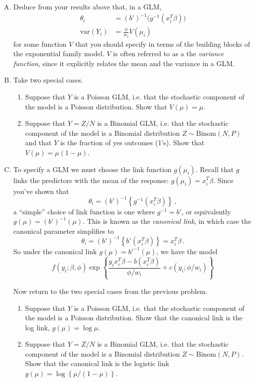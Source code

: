 \documentclass{mynotes}
\begin{document}
\begin{enumerate}[(A)]

\item Deduce from your results above that, in a GLM,
 $$
\begin{aligned}
\theta_i &= (b')^{-1} \Big( g^{-1}(x_i^T \beta) \Big) \\
\mbox{var} (Y_i ) &= \frac{\phi}{w_i} V(\mu_i)
\end{aligned}
$$
for some function $V$ that you should specify in terms of the building blocks of the exponential family model.  $V$ is often referred to as a the \emph{variance function}, since it explicitly relates the mean and the variance in a GLM.  

\item Take two special cases.  
\begin{enumerate}[(1)]
\item Suppose that $Y$ is a Poisson GLM, i.e. that the stochastic component of the model is a Poisson distribution.  Show that $V(\mu) = \mu$.
\item Suppose that $Y = Z/N$ is a Binomial GLM, i.e. that the stochastic component of the model is a Binomial distribution $Z \sim \mbox{Binom}(N, P)$ and that $Y$ is the fraction of yes outcomes (1's).  Show that $V(\mu) = \mu(1-\mu)$.  
\end{enumerate}

\item To specify a GLM we must choose the link function $g(\mu_i)$.  Recall that $g$ links the predictors with the mean of the response: $g(\mu_i) = x_i^T \beta$.  Since you've shown that
$$
\theta_i = (b')^{-1} \left\{g^{-1}(x_i^T \beta) \right\} \, ,
$$
a ``simple'' choice of link function is one where $g^{-1} = b'$, or equivalently $g(\mu) = (b')^{-1}(\mu)$.  This is known as the \textit{canonical link}, in which case the canonical parameter simplifies to
$$
\theta_i = (b')^{-1} \left\{b'(x_i^T \beta) \right\} = x_i^T \beta \, .
$$
So under the canonical link $g(\mu) = b'^{-1}(\mu)$, we have the model
$$
f(y_i; \beta, \phi) \exp \left\{ \frac{y_i x_i^T \beta - b(x_i^T \beta)}{\phi/w_i} + c(y_i; \phi/w_i)   \right \}
$$

Now return to the two special cases from the previous problem.
\begin{enumerate}[(1)]
\item Suppose that $Y$ is a Poisson GLM, i.e. that the stochastic component of the model is a Poisson distribution. Show that the canonical link is the log link, $g(\mu) = \log \mu$.  
\item Suppose that $Y = Z/N$ is a Binomial GLM, i.e. that the stochastic component of the model is a Binomial distribution $Z \sim \mbox{Binom}(N, P)$.   Show that the canonical link is the logistic link $g(\mu) = \log \left\{ \mu/(1-\mu) \right\}$.  
\end{enumerate}

\end{enumerate}
\end{document}
